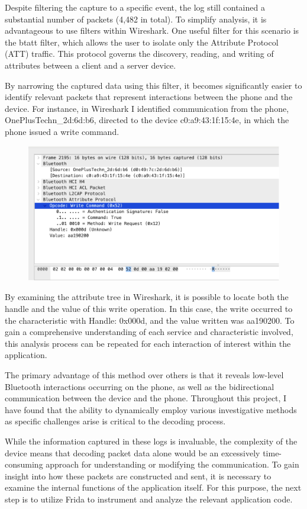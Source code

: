 Despite filtering the capture to a specific event, the log still contained a substantial number of packets (4,482 in total). To simplify analysis, it is advantageous to use filters within Wireshark. One useful filter for this scenario is the btatt filter, which allows the user to isolate only the Attribute Protocol (ATT) traffic. This protocol governs the discovery, reading, and writing of attributes between a client and a server device.

By narrowing the captured data using this filter, it becomes significantly easier to identify relevant packets that represent interactions between the phone and the device. For instance, in Wireshark I identified communication from the phone, OnePlusTechn\_2d:6d:b6, directed to the device c0:a9:43:1f:15:4e, in which the phone issued a write command.

\begin{figure}
	\centering
	\includegraphics[width=0.7\linewidth]{hci_tree_wireshark}
	\caption{}
	\label{fig:hcitreewireshark}
\end{figure}

By examining the attribute tree in Wireshark, it is possible to locate both the handle and the value of this write operation. In this case, the write occurred to the characteristic with Handle: 0x000d, and the value written was aa190200. To gain a comprehensive understanding of each service and characteristic involved, this analysis process can be repeated for each interaction of interest within the application.

The primary advantage of this method over others is that it reveals low-level Bluetooth interactions occurring on the phone, as well as the bidirectional communication between the device and the phone. Throughout this project, I have found that the ability to dynamically employ various investigative methods as specific challenges arise is critical to the decoding process.

While the information captured in these logs is invaluable, the complexity of the device means that decoding packet data alone would be an excessively time-consuming approach for understanding or modifying the communication. To gain insight into how these packets are constructed and sent, it is necessary to examine the internal functions of the application itself. For this purpose, the next step is to utilize Frida to instrument and analyze the relevant application code.

